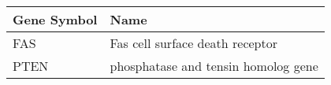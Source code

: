 \begin{tabular}{ll}
\toprule
Gene Symbol &                                Name \\
\midrule
        FAS &     Fas cell surface death receptor \\
       PTEN & phosphatase and tensin homolog gene \\
\bottomrule
\end{tabular}
